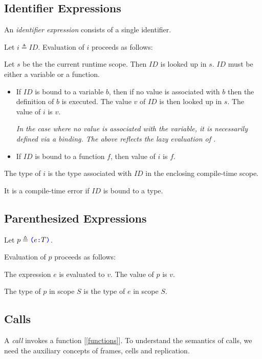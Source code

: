 \documentclass{article}
\begin{document}
\subsection{Identifier Expressions}
\label{identifierExpressions}

An {\em identifier expression} consists of a single identifier.

\IdentifierExpression{}

Let $i \triangleq ID$.
Evaluation of $i$ proceeds as follows:


Let $s$ be the the current runtime scope. Then $ID$ is looked up in $s$. $ID$ must be either a variable or a function.
\begin{itemize}
\item If $ID$ is bound to a variable $b$, then if no value is associated with $b$ then the definition of $b$ is executed. The value $v$ of $ID$ is then looked up in $s$. The value of $i$ is $v$.

{\em In the case where no value is associated with the variable, it is necessarily defined via  a \LET{} binding. The above reflects the lazy evaluation of \LET{}.}

\item If $ID$ is bound to a function $f$, then value of $i$ is $f$. 
\end{itemize}

The type of $i$ is the type associated with $ID$ in the enclosing compile-time scope.

It is a compile-time error if $ID$ is bound to a type. 


\subsection{Parenthesized Expressions}
\label{parenthesizedExpressions}

\ParenthesizedExpression{}

Let $p \triangleq \texttt{\color{blue} (}{}e \texttt{\color{blue} :}{} T \texttt{\color{blue} )}{}$.

Evaluation of $p$ proceeds as follows:

The expression $e$ is evaluated to $v$. The value of $p$ is $v$.

The type of $p$ in scope $S$ is the type of $e$ in scope $S$.

\subsection{Calls}
\label{calls}

A {\em call} invokes a function [\ref{functions}]. To understand the semantics of calls, we need the auxiliary concepts of frames, cells and replication.
\end{document}
